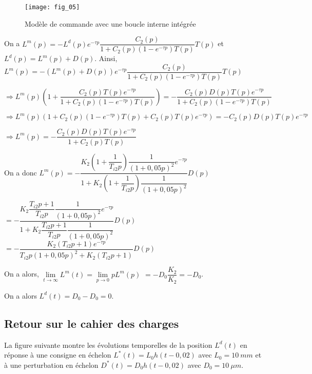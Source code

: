 \begin{figure}[!h]
\texttt{[image: fig\_05]}
\caption{Modèle de commande avec une boucle interne intégrée}
\end{figure}
\fi



\ifprof
\begin{corrige}
On a $L^m(p)=-L^d(p) e^{-\tau p} \dfrac{C_2(p)}{1+C_2(p)\left(1-e^{-\tau p}\right)T(p)} T(p)$ 
et $L^d(p)=L^m(p)+D(p)$.
Ainsi,
$L^m(p)=-\left( L^m(p)+D(p)\right) e^{-\tau p} \dfrac{C_2(p)}{1+C_2(p)\left(1-e^{-\tau p}\right)T(p)} T(p)$ 

$\Rightarrow L^m(p)\left(1+ \dfrac{C_2(p) T(p)e^{-\tau p}}{1+C_2(p)\left(1-e^{-\tau p}\right)T(p)}  \right)=- \dfrac{C_2(p) D(p) T(p)e^{-\tau p}}{1+C_2(p)\left(1-e^{-\tau p}\right)T(p)} $

$\Rightarrow L^m(p)\left(1+C_2(p)\left(1-e^{-\tau p}\right)T(p)+ C_2(p) T(p)e^{-\tau p}  \right)=- C_2(p) D(p) T(p)e^{-\tau p}$ 


$\Rightarrow L^m(p)=- \dfrac{C_2(p) D(p) T(p)e^{-\tau p}}{1+C_2(p)T(p) }$ 

On a donc $L^m(p)=- \dfrac{K_2 \left( 1+\dfrac{1}{T_{i2}p}\right)  \dfrac{1}{\left(1+0,05p\right)^2}e^{-\tau p}}{1+K_2 \left( 1+\dfrac{1}{T_{i2}p}\right)\dfrac{1}{\left(1+0,05p\right)^2}}D(p)$

$=- \dfrac{K_2 \dfrac{T_{i2}p+1}{T_{i2}p}  \dfrac{1}{\left(1+0,05p\right)^2}e^{-\tau p}}{1+K_2 \dfrac{T_{i2}p+1}{T_{i2}p}\dfrac{1}{\left(1+0,05p\right)^2}}D(p)$
$=- \dfrac{K_2 \left(T_{i2}p+1\right)  e^{-\tau p}}{T_{i2}p\left(1+0,05p\right)^2+K_2 \left(T_{i2}p+1\right)}D(p)$

On a alors, 
$\lim\limits_{t \to \infty} L^m(t) = \lim\limits_{p \to 0} p L^m(p)  $ 
$ =-D_0  \dfrac{K_2 }{K_2} =-D_0$.

On a alors $L^d(t)=D_0 - D_0 = 0$.

\end{corrige}
\else
\fi

\subsection*{Retour sur le cahier des charges}
\ifprof
\else
La figure suivante montre les évolutions temporelles de la position $L^d(t)$ en réponse
à une consigne en échelon $L^*(t)=L_0 h(t-0,02)$ avec $L_0 = \SI{10}{mm}$ et à une perturbation en échelon $D^*(t) = D_0 h(t-0,02)$ avec $D_0=\SI{10}{\mu m}$. 
\fi

